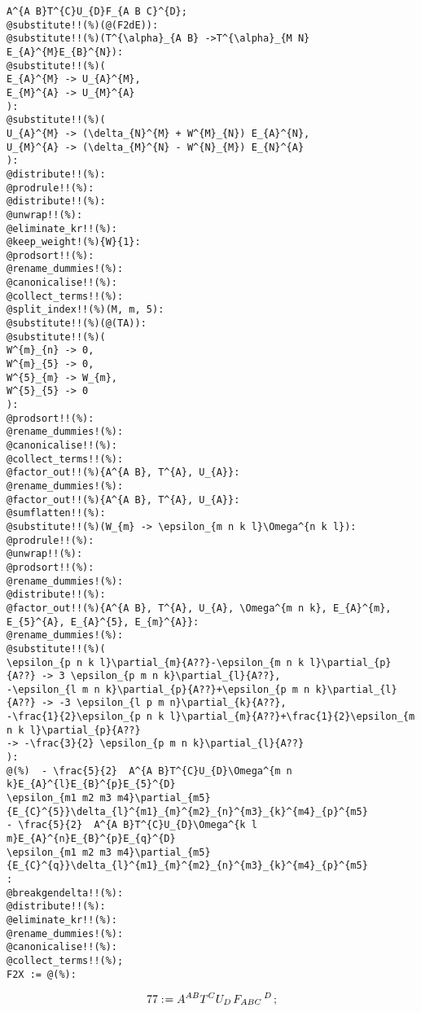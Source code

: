 \documentclass[11pt]{article}
\def\specialcolon{\mathrel{\mathop{:}}\hspace{-.5em}}
\begin{document}
{\color[named]{Blue}\begin{verbatim}
A^{A B}T^{C}U_{D}F_{A B C}^{D};
@substitute!!(%)(@(F2dE)):
@substitute!!(%)(T^{\alpha}_{A B} ->T^{\alpha}_{M N} E_{A}^{M}E_{B}^{N}):
@substitute!!(%)(
E_{A}^{M} -> U_{A}^{M},
E_{M}^{A} -> U_{M}^{A}
):
@substitute!!(%)(
U_{A}^{M} -> (\delta_{N}^{M} + W^{M}_{N}) E_{A}^{N},
U_{M}^{A} -> (\delta_{M}^{N} - W^{N}_{M}) E_{N}^{A}
):
@distribute!!(%):
@prodrule!!(%):
@distribute!!(%):
@unwrap!!(%):
@eliminate_kr!!(%):
@keep_weight!(%){W}{1}:
@prodsort!!(%):
@rename_dummies!(%):
@canonicalise!!(%):
@collect_terms!!(%):
@split_index!!(%)(M, m, 5):
@substitute!!(%)(@(TA)):
@substitute!!(%)(
W^{m}_{n} -> 0,
W^{m}_{5} -> 0,
W^{5}_{m} -> W_{m},
W^{5}_{5} -> 0
):
@prodsort!!(%):
@rename_dummies!(%):
@canonicalise!!(%):
@collect_terms!!(%):
@factor_out!!(%){A^{A B}, T^{A}, U_{A}}:
@rename_dummies!(%):
@factor_out!!(%){A^{A B}, T^{A}, U_{A}}:
@sumflatten!!(%):
@substitute!!(%)(W_{m} -> \epsilon_{m n k l}\Omega^{n k l}):
@prodrule!!(%):
@unwrap!!(%):
@prodsort!!(%):
@rename_dummies!(%):
@distribute!!(%):
@factor_out!!(%){A^{A B}, T^{A}, U_{A}, \Omega^{m n k}, E_{A}^{m}, E_{5}^{A}, E_{A}^{5}, E_{m}^{A}}:
@rename_dummies!(%):
@substitute!!(%)(
\epsilon_{p n k l}\partial_{m}{A??}-\epsilon_{m n k l}\partial_{p}{A??} -> 3 \epsilon_{p m n k}\partial_{l}{A??},
-\epsilon_{l m n k}\partial_{p}{A??}+\epsilon_{p m n k}\partial_{l}{A??} -> -3 \epsilon_{l p m n}\partial_{k}{A??},
-\frac{1}{2}\epsilon_{p n k l}\partial_{m}{A??}+\frac{1}{2}\epsilon_{m n k l}\partial_{p}{A??} 
-> -\frac{3}{2} \epsilon_{p m n k}\partial_{l}{A??}
):
@(%)  - \frac{5}{2}  A^{A B}T^{C}U_{D}\Omega^{m n k}E_{A}^{l}E_{B}^{p}E_{5}^{D}
\epsilon_{m1 m2 m3 m4}\partial_{m5}{E_{C}^{5}}\delta_{l}^{m1}_{m}^{m2}_{n}^{m3}_{k}^{m4}_{p}^{m5}
- \frac{5}{2}  A^{A B}T^{C}U_{D}\Omega^{k l m}E_{A}^{n}E_{B}^{p}E_{q}^{D}
\epsilon_{m1 m2 m3 m4}\partial_{m5}{E_{C}^{q}}\delta_{l}^{m1}_{m}^{m2}_{n}^{m3}_{k}^{m4}_{p}^{m5}
:
@breakgendelta!!(%):
@distribute!!(%):
@eliminate_kr!!(%):
@rename_dummies!(%):
@canonicalise!!(%):
@collect_terms!!(%);
F2X := @(%):
\end{verbatim}}
\begin{dmath*}[compact, spread=2pt]
77\specialcolon{}= {A}^{A B} {T}^{C} {U}_{D\, } {F}_{A B C}\,^{D\, };
\end{dmath*}
\end{document}

